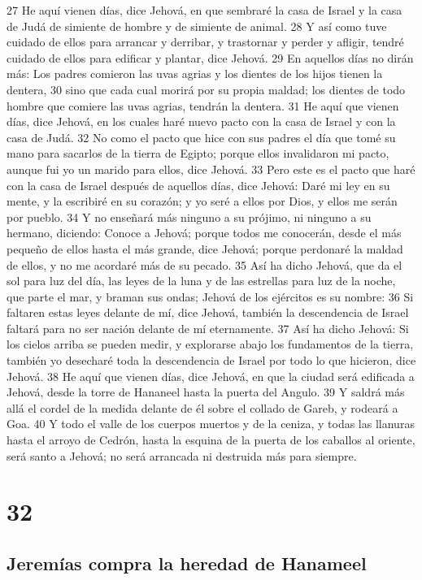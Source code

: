 27 He aquí vienen días, dice Jehová, en que sembraré la casa de Israel y la casa de Judá de simiente de hombre y de simiente de animal.
28 Y así como tuve cuidado de ellos para arrancar y derribar, y trastornar y perder y afligir, tendré cuidado de ellos para edificar y plantar, dice Jehová.
29 En aquellos días no dirán más: Los padres comieron las uvas agrias y los dientes de los hijos tienen la dentera, 
30 sino que cada cual morirá por su propia maldad; los dientes de todo hombre que comiere las uvas agrias, tendrán la dentera.
31 He aquí que vienen días, dice Jehová, en los cuales haré nuevo pacto con la casa de Israel y con la casa de Judá.
32 No como el pacto que hice con sus padres el día que tomé su mano para sacarlos de la tierra de Egipto; porque ellos invalidaron mi pacto, aunque fui yo un marido para ellos, dice Jehová.
33 Pero este es el pacto que haré con la casa de Israel después de aquellos días, dice Jehová: Daré mi ley en su mente, y la escribiré en su corazón; y yo seré a ellos por Dios, y ellos me serán por pueblo.
34 Y no enseñará más ninguno a su prójimo, ni ninguno a su hermano, diciendo: Conoce a Jehová; porque todos me conocerán, desde el más pequeño de ellos hasta el más grande, dice Jehová; porque perdonaré la maldad de ellos, y no me acordaré más de su pecado. 
35 Así ha dicho Jehová, que da el sol para luz del día, las leyes de la luna y de las estrellas para luz de la noche, que parte el mar, y braman sus ondas; Jehová de los ejércitos es su nombre:
36 Si faltaren estas leyes delante de mí, dice Jehová, también la descendencia de Israel faltará para no ser nación delante de mí eternamente.
37 Así ha dicho Jehová: Si los cielos arriba se pueden medir, y explorarse abajo los fundamentos de la tierra, también yo desecharé toda la descendencia de Israel por todo lo que hicieron, dice Jehová.
38 He aquí que vienen días, dice Jehová, en que la ciudad será edificada a Jehová, desde la torre de Hananeel hasta la puerta del Angulo.
39 Y saldrá más allá el cordel de la medida delante de él sobre el collado de Gareb, y rodeará a Goa.
40 Y todo el valle de los cuerpos muertos y de la ceniza, y todas las llanuras hasta el arroyo de Cedrón, hasta la esquina de la puerta de los caballos al oriente, será santo a Jehová; no será arrancada ni destruida más para siempre.

\chapter{32}

\section*{Jeremías compra la heredad de Hanameel}

